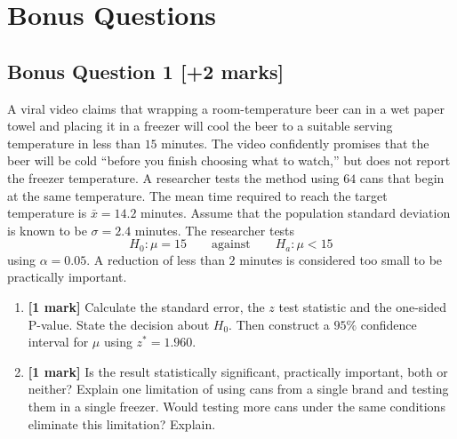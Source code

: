 \documentclass[10pt,letterpaper]{article}
\begin{document}
\newpage

\section*{Bonus Questions}
\subsection*{Bonus Question 1 \hfill [+2 marks]}
A viral video claims that wrapping a room-temperature beer can in a wet paper towel and placing it in a freezer will cool the beer to a suitable serving temperature in less than $15$ minutes. The video confidently promises that the beer will be cold ``before you finish choosing what to watch,'' but does not report the freezer temperature. A researcher tests the method using $64$ cans that begin at the same temperature. The mean time required to reach the target temperature is $\bar{x}=14.2$ minutes. Assume that the population standard deviation is known to be $\sigma=2.4$ minutes. The researcher tests
\[
H_0:\mu=15
\qquad\text{against}\qquad
H_a:\mu<15
\]
using $\alpha=0.05$. A reduction of less than $2$ minutes is considered too small to be practically important.

\begin{enumerate}[label=\alph*.]
	\item \textbf{[1 mark]} Calculate the standard error, the $z$ test statistic and the one-sided P-value. State the decision about $H_0$. Then construct a $95\%$ confidence interval for $\mu$ using $z^*=1.960$.
	\item \textbf{[1 mark]} Is the result statistically significant, practically important, both or neither? Explain one limitation of using cans from a single brand and testing them in a single freezer. Would testing more cans under the same conditions eliminate this limitation? Explain.
\end{enumerate}
\end{document}
